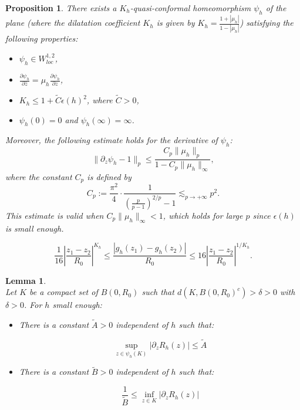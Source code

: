 \documentclass[10pt,a4paper]{amsart}
\newtheorem{prop}{Proposition}
\newtheorem{lem}{Lemma}
\begin{document}
\begin{prop}
\label{prop: def_de_psi_h}
There exists a $K_h$-quasi-conformal homeomorphism $\psi_h$ of the plane (where the dilatation coefficient $K_h$ is given by $K_h = \frac{1 + |\mu_h|}{1 - |\mu_h|}$) satisfying the following properties:
\begin{itemize}
    \item $\psi_h \in W_{loc}^{1,2}$,
    \item $\frac{\partial \psi_h}{\partial \bar{z}} = \mu_h \frac{\partial \psi_h}{\partial z}$,
    \item $K_h \leq 1 + \tilde{C} \epsilon(h)^2$, where $\tilde{C} > 0$,
    \item $\psi_h(0) = 0$ and $\psi_h(\infty) = \infty$.
\end{itemize}

Moreover, the following estimate holds for the derivative of $\psi_h$:
\begin{equation}
\|\partial_z \psi_h - 1\|_p \leq \frac{C_p \|\mu_h\|_p}{1 - C_p \|\mu_h\|_\infty},
\end{equation}
where the constant $C_p$ is defined by
\begin{equation}
C_p := \frac{\pi^2}{4} \cdot \frac{1}{\left(\frac{p}{p-1}\right)^{2/p} - 1} \lesssim_{p \to +\infty} p^2.
\end{equation}
This estimate is valid when $C_p \|\mu_h\|_\infty < 1$, which holds for large $p$ since $\epsilon(h)$ is small enough.
\end{prop}

\begin{equation}
\frac{1}{16} \left| \frac{z_1 - z_2}{R_0} \right|^{K_h} \leq \frac{|g_h(z_1) - g_h(z_2)|}{R_0} \leq 16 \left| \frac{z_1 - z_2}{R_0} \right|^{1/K_h}.
\label{eq: InegdeMori}
\end{equation}

\begin{lem}
		\hfill\\
		Let $K$ be a compact set of $B(0,R_0)$ such that $d(K, B(0,R_0)^c)>\delta>0$ with $\delta>0$. For $h$ small enough:
		\begin{itemize}
			\item There is a constant $\tilde{A}>0$ independent of $h$ such that:
			
			\begin{equation}
				\sup_{z\in \psi_h(K)}|\partial_z R_h(z)|\leq \tilde{A}
			\end{equation}
			
			\item There is a constant $\tilde{B}>0$ independent of $h$ such that:
			
			\begin{equation}
				\frac{1}{\tilde{B}}\leq \inf_{z\in K}|\partial_z R_h(z)|
			\end{equation}
			
		\end{itemize}
	\end{lem}
\end{document}
